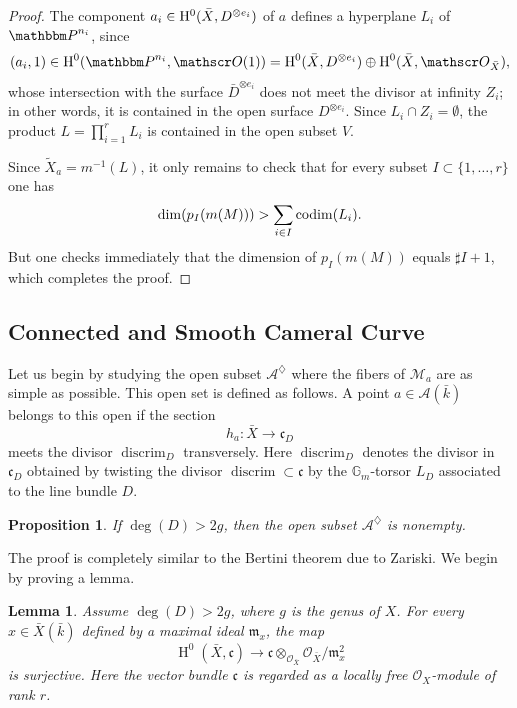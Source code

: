 \documentclass[12pt,english]{smfart}
\numberwithin{equation}{subsection}
\newtheorem{lemma}[equation]{Lemma}
\newtheorem{proposition}[equation]{Proposition}
\theoremstyle{remark}
\newcommand\calO{{\mathscr O}}
\newcommand\bbP{{\mathbbm P}}
\newcommand\rmH{{\rm H}}
\begin{document}
\begin{proof}
The component $a_i\in\rmH^0(\bar X,D^{\otimes e_i})$ of $a$ defines a hyperplane $L_i$ of $\bbP^{n_i}$, since
$$(a_i,1)\in \rmH^0(\bbP^{n_i},\calO(1))=\rmH^0(\bar X,D^{\otimes e_i})\oplus \rmH^0(\bar X,\calO_{\bar X}),$$
whose intersection with the surface $\bar D^{\otimes e_i}$ does not meet the divisor at infinity $Z_i$; in other words, it is contained in the open surface $D^{\otimes e_i}$. Since $L_i\cap Z_i=\emptyset$, the product $L=\prod_{i=1}^r L_i$ is contained in the open subset $V$.

Since $\widetilde X_a=m^{-1}(L)$, it only remains to check that for every subset $I\subset\{1,\ldots,r\}$ one has
$$\dim(p_I(m(M)))>\sum_{i\in I}{\rm codim}(L_i).$$
But one checks immediately that the dimension of $p_I(m(M))$ equals $\sharp I+1$, which completes the proof.
\end{proof}

\subsection{Connected and Smooth Cameral Curve}
\label{subsection : A diamond}

Let us begin by studying the open subset $\mathcal{A}^\diamondsuit$ where the fibers of $\mathcal{M}_a$
are as simple as possible. This open set is defined as follows.
A point $a\in \mathcal{A}(\bar{k})$ belongs to this open if the section
$$
h_a:\bar{X}\rightarrow \mathfrak{c}_D
$$
meets the divisor $\operatorname{discrim}_{D}$ transversely. Here $\operatorname{discrim}_{D}$ denotes
the divisor in $\mathfrak{c}_D$ obtained by twisting the divisor $\operatorname{discrim}\subset \mathfrak{c}$
by the $\mathbb{G}_m$-torsor $L_D$ associated to the line bundle $D$.

\begin{proposition} \label{A diamond non vide}
If $\deg(D)>2g$, then the open subset $\mathcal{A}^\diamondsuit$ is nonempty.
\end{proposition}

The proof is completely similar to the Bertini theorem due to Zariski. We begin by proving a lemma.

\begin{lemma}\label{deg(D)>2g}
Assume $\deg(D)>2g$, where $g$ is the genus of $X$. For every $x\in \bar{X}(\bar{k})$
defined by a maximal ideal $\mathfrak{m}_x$, the map
$$
\operatorname{H}^0(\bar{X},\mathfrak{c})\longrightarrow \mathfrak{c}\otimes_{\mathcal{O}_{\bar{X}}}\mathcal{O}_{\bar{X}}/\mathfrak{m}_x^2
$$
is surjective. Here the vector bundle $\mathfrak{c}$ is regarded as a locally free $\mathcal{O}_X$-module of rank $r$.
\end{lemma}
\end{document}
